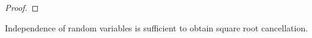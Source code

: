 \documentclass[12pt,reqno]{article}
\numberwithin{equation}{section}
\begin{document}
\begin{proof}
\begin{comment}
    \begin{equation} \label{equationGGUSCCCYVSSXX998723}
    \begin{split}
        |\widehat{f}(\xi)| &\lesssim_T \varepsilon_0^{-T} |\xi|^{-T}\\
        &\leq \left[ \frac{C^T K^{T/\beta} |\xi|^{\beta/2 - T}}{\log(1 + |\xi|)^{1/2}} \right] |\xi|^{-\beta/2} \log(1 + |\xi|)^{1/2}\\
        &\leq \left[ \frac{C^T K^{1/2 + (\beta/2 - T) \varepsilon}}{\log(1 + K^{1/\beta + \varepsilon})^{1/2}} \right] |\xi|^{-\beta/2} \log(1 + |\xi|)^{1/2}.
    \end{split}
    \end{equation}
    If we choose $T > \beta/2 + 1/2 \varepsilon$, then the value in the brackets in \eqref{equationGGUSCCCYVSSXX998723} decays as $K \to \infty$. Thus we conclude from \eqref{equationGGUSCCCYVSSXX998723} that
    \begin{equation} \label{equationBBCDSGDCC77}
        |\widehat{f}(\xi)| \lesssim_{C,d,\varepsilon} |\xi|^{-\beta/2} \log(1 + |\xi|)^{1/2}.
    \end{equation}
    Combining \eqref{equationGGIOHISI99234}, \eqref{equationUUUDDDCII777}, and \eqref{equationBBCDSGDCC77} completes the proof.
\end{comment}
\end{proof}

Independence of random variables is sufficient to obtain square root cancellation.
\end{document}
